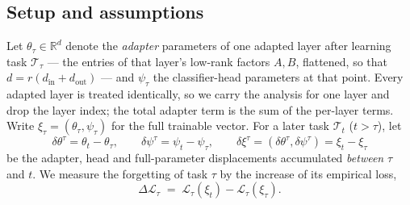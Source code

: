 \subsection{Setup and assumptions}
\label{sec:theory_setup}
Let $\theta_\tau\in\mathbb{R}^{d}$ denote the \emph{adapter} parameters of one adapted layer
after learning task $\mathcal{T}_\tau$ --- the entries of that layer's low-rank factors
$A,B$, flattened, so that $d=r(d_{\text{in}}+d_{\text{out}})$ --- and $\psi_\tau$ the
classifier-head parameters at that point. Every adapted layer is treated identically, so we
carry the analysis for one layer and drop the layer index; the total adapter term is the sum
of the per-layer terms. Write $\xi_\tau=(\theta_\tau,\psi_\tau)$ for the full trainable
vector. For a later task $\mathcal{T}_t$ ($t>\tau$), let
\begin{equation}
\delta\theta^{\tau}=\theta_t-\theta_\tau,
\qquad
\delta\psi^{\tau}=\psi_t-\psi_\tau,
\qquad
\delta\xi^{\tau}=(\delta\theta^{\tau},\delta\psi^{\tau})=\xi_t-\xi_\tau
\label{eq:displacements}
\end{equation}
be the adapter, head and full-parameter displacements accumulated \emph{between} $\tau$ and
$t$. We measure the forgetting of task $\tau$ by the increase of its empirical loss,
\begin{equation}
\Delta\mathcal{L}_\tau \;=\; \mathcal{L}_\tau(\xi_t) - \mathcal{L}_\tau(\xi_\tau).
\label{eq:forget_def}
\end{equation}

